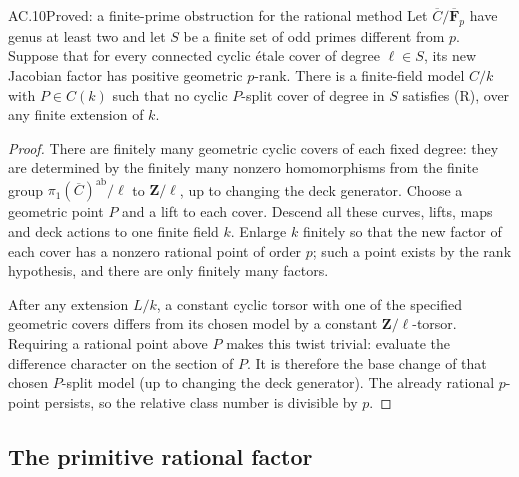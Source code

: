 \begin{claim}{AC.10}{Proved: a finite-prime obstruction for the rational method}
Let $\overline C/\overline{\mathbf F}_p$ have genus at least two and let
$S$ be a finite set of odd primes different from $p$.  Suppose that for
every connected cyclic \'etale cover of degree $\ell\in S$, its new
Jacobian factor has positive geometric $p$-rank.  There is a finite-field
model $C/k$ with $P\in C(k)$ such that no cyclic $P$-split cover of degree
in $S$ satisfies (R), over any finite extension of $k$.
\end{claim}
\begin{proof}
There are finitely many geometric cyclic covers of each fixed degree:
they are determined by the finitely many nonzero homomorphisms from the
finite group $\pi_1(\overline C)^{\mathrm{ab}}/\ell$ to $\mathbf Z/\ell$,
up to changing the deck generator.  Choose a geometric point $P$ and a
lift to each cover.  Descend all these curves, lifts, maps and deck actions
to one finite field $k$.  Enlarge $k$ finitely so that the new factor of
each cover has a nonzero rational point of order $p$; such a point exists
by the rank hypothesis, and there are only finitely many factors.

After any extension $L/k$, a constant cyclic torsor with one of the
specified geometric covers differs from its chosen model by a constant
$\mathbf Z/\ell$-torsor.  Requiring a rational point above $P$ makes this
twist trivial: evaluate the difference character on the section of $P$.
It is therefore the base change of that chosen $P$-split model (up to
changing the deck generator).  The already rational $p$-point persists,
so the relative class number is divisible by $p$.
\end{proof}

\subsection{The primitive rational factor}

